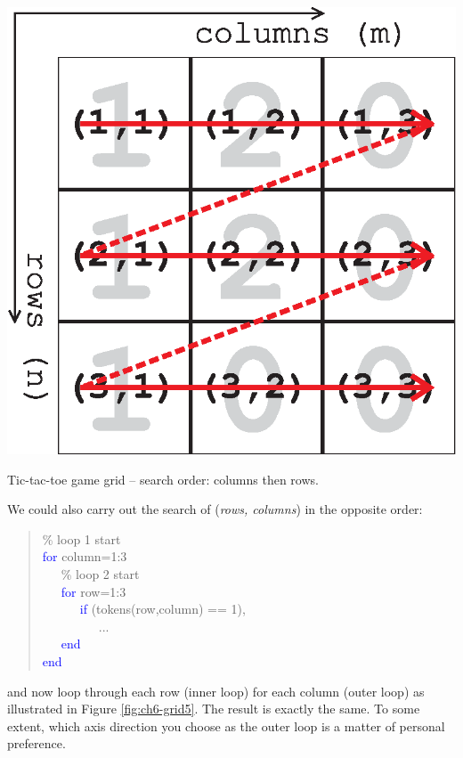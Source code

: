 \documentclass{tufte-book} %
\newenvironment{docspec}{\begin{quotation}\ttfamily\parskip0pt\parindent0pt\ignorespaces}{\end{quotation}}
\begin{document}
\begin{marginfigure}[0.0in]
\includegraphics[width=\linewidth]{ch6-grid4.eps}
\caption{Tic-tac-toe game grid -- search order: columns then rows.}
\label{fig:ch6-grid4}
\end{marginfigure}

We could also carry out the search of (\textit{rows, columns}) in the opposite order:
\begin{docspec}
\textcolor[rgb]{0,0.501961,0}{\% loop 1 start\\}
\textcolor{blue}{for} column=1:3\\
\ \ \ \textcolor[rgb]{0,0.501961,0}{\% loop 2 start\\}
\ \ \ \textcolor{blue}{for} row=1:3\\
\ \ \ \ \ \ \textcolor{blue}{if} (tokens(row,column) == 1),\\
\ \ \ \ \ \ \ \ \ ...\\
\ \ \ \textcolor{blue}{end}\\
\textcolor{blue}{end}
\end{docspec}
and now loop through each row (inner loop) for each column (outer loop) as illustrated in Figure \ref{fig:ch6-grid5}. The result is exactly the same. To some extent, which axis direction you choose as the outer loop is a matter of personal preference.
\end{document}
